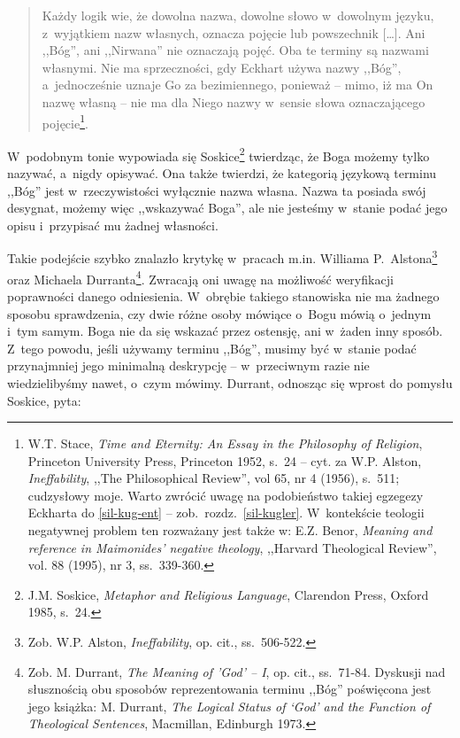 \begin{quote}
Każdy logik wie, że dowolna nazwa, dowolne słowo w~dowolnym języku, z~wyjątkiem nazw własnych, oznacza pojęcie lub powszechnik [\ldots]. Ani ,,Bóg'', ani ,,Nirwana'' nie oznaczają pojęć. Oba te terminy są nazwami własnymi. Nie ma sprzeczności, gdy Eckhart używa nazwy ,,Bóg'', a~jednocześnie uznaje Go za bezimiennego, ponieważ -- mimo, iż ma On nazwę własną -- nie ma dla Niego nazwy w~sensie słowa oznaczającego pojęcie\footnote{W.T. Stace, \textit{Time and Eternity: An Essay in the Philosophy of Religion}, Princeton University Press, Princeton 1952, s.~24 -- cyt. za W.P. Alston, \textit{Ineffability}, ,,The Philosophical Review'', vol 65, nr 4 (1956), s.~511; cudzysłowy moje. Warto zwrócić uwagę na podobieństwo takiej egzegezy Eckharta do \ref{sil-kug-ent} -- zob.~rozdz.~\ref{sil-kugler}. W~kontekście teologii negatywnej problem ten rozważany jest także w: E.Z. Benor, \textit{Meaning and reference in Maimonides' negative theology}, ,,Harvard Theological Review'', vol. 88 (1995), nr 3, ss.~339-360.}.
\end{quote}

W~podobnym tonie wypowiada się Soskice\footnote{J.M. Soskice, \textit{Metaphor and Religious Language}, Clarendon Press, Oxford 1985, s.~24.} twierdząc, że Boga możemy tylko nazywać, a~nigdy opisywać. Ona także twierdzi, że kategorią językową terminu ,,Bóg'' jest w~rzeczywistości wyłącznie nazwa własna. Nazwa ta posiada swój desygnat, możemy więc ,,wskazywać
Boga'', ale nie jesteśmy w~stanie podać jego opisu i~przypisać mu żadnej własności.

Takie podejście szybko znalazło krytykę w~pracach m.in. Williama P.~Alstona\footnote{Zob. W.P. Alston, \textit{Ineffability}, op. cit., ss.~506-522.} oraz Michaela Durranta\footnote{Zob. M. Durrant, \textit{The Meaning of 'God' -- I},
op. cit.,
ss.~71-84. Dyskusji nad słusznością obu sposobów reprezentowania terminu ,,Bóg'' poświęcona jest jego książka: M. Durrant, \textit{The Logical Status of ‘God' and the Function of Theological Sentences}, Macmillan, Edinburgh 1973.}. Zwracają oni uwagę na możliwość weryfikacji poprawności danego odniesienia. W~obrębie takiego stanowiska nie ma żadnego sposobu sprawdzenia, czy dwie różne osoby mówiące o~Bogu mówią o~jednym i~tym samym. Boga nie da się wskazać przez ostensję, ani w~żaden inny sposób. Z~tego powodu, jeśli używamy terminu ,,Bóg'', musimy być w~stanie podać przynajmniej jego minimalną deskrypcję -- w~przeciwnym razie nie wiedzielibyśmy nawet, o~czym mówimy. Durrant, odnosząc się wprost do pomysłu Soskice, pyta:

